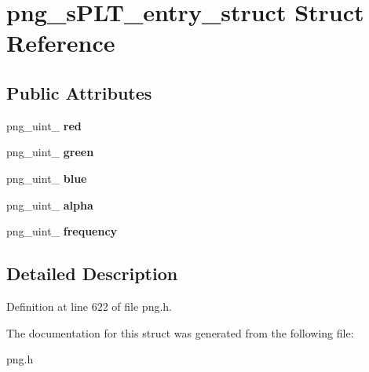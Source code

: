 \hypertarget{structpng__sPLT__entry__struct}{\section{png\+\_\+s\+P\+L\+T\+\_\+entry\+\_\+struct Struct Reference}
\label{structpng__sPLT__entry__struct}
}
\subsection*{Public Attributes}
\begin{DoxyCompactItemize}
\item 
\hypertarget{structpng__sPLT__entry__struct_a05ba3cef8aa2c43d1f52c0300c525fd9}{png\+\_\+uint\+\_ {\bfseries red}}\label{structpng__sPLT__entry__struct_a05ba3cef8aa2c43d1f52c0300c525fd9}

\item 
\hypertarget{structpng__sPLT__entry__struct_a3b4269fb63b4087bd618a6741b805554}{png\+\_\+uint\+\_ {\bfseries green}}\label{structpng__sPLT__entry__struct_a3b4269fb63b4087bd618a6741b805554}

\item 
\hypertarget{structpng__sPLT__entry__struct_a2af6281d3b400362886a43977ebcb7db}{png\+\_\+uint\+\_ {\bfseries blue}}\label{structpng__sPLT__entry__struct_a2af6281d3b400362886a43977ebcb7db}

\item 
\hypertarget{structpng__sPLT__entry__struct_abea98962a064e2a05f460b9f2ea2f47b}{png\+\_\+uint\+\_ {\bfseries alpha}}\label{structpng__sPLT__entry__struct_abea98962a064e2a05f460b9f2ea2f47b}

\item 
\hypertarget{structpng__sPLT__entry__struct_ad8095a15bb5a054c12ef911478c5f3a3}{png\+\_\+uint\+\_ {\bfseries frequency}}\label{structpng__sPLT__entry__struct_ad8095a15bb5a054c12ef911478c5f3a3}

\end{DoxyCompactItemize}


\subsection{Detailed Description}


Definition at line 622 of file png.\+h.



The documentation for this struct was generated from the following file\+:\begin{DoxyCompactItemize}
\item 
png.\+h\end{DoxyCompactItemize}
